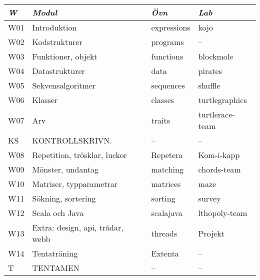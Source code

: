 \begin{tabular}{l|l|l|l}
\textit{W} & \textit{Modul} & \textit{Övn} & \textit{Lab} \\ \hline \hline
W01 & Introduktion & expressions & kojo \\
W02 & Kodstrukturer & programs & -- \\
W03 & Funktioner, objekt & functions & blockmole \\
W04 & Datastrukturer & data & pirates \\
W05 & Sekvensalgoritmer & sequences & shuffle \\
W06 & Klasser & classes & turtlegraphics \\
W07 & Arv & traits & turtlerace-team \\
KS & KONTROLLSKRIVN. & -- & -- \\
W08 & Repetition, trösklar, luckor & Repetera & Kom-i-kapp \\
W09 & Mönster, undantag & matching & chords-team \\
W10 & Matriser, typparametrar & matrices & maze \\
W11 & Sökning, sortering & sorting & survey \\
W12 & Scala och Java & scalajava & lthopoly-team \\
W13 & Extra: design, api, trådar, webb & threads & Projekt \\
W14 & Tentaträning & Extenta & -- \\
T & TENTAMEN & -- & -- \\
\end{tabular}
